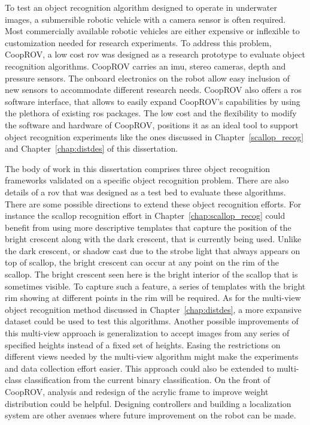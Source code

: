 \documentclass {udthesis}
\begin{document}
To test an object recognition algorithm designed to operate in underwater images, a submersible robotic vehicle with a camera sensor is often required.
Most commercially available robotic vehicles are either expensive or inflexible to customization needed for research experiments. To address this problem, CoopROV, a low cost \gls{rov} was designed as a research prototype to evaluate object recognition algorithms. CoopROV carries an \gls{imu}, stereo cameras, depth and pressure sensors. The onboard electronics on the robot allow easy inclusion of new sensors to accommodate different research needs. CoopROV also offers a \gls{ros} software interface, that allows to easily expand CoopROV's capabilities by using the plethora of existing \gls{ros} packages. The low cost and the flexibility to modify the software and hardware of CoopROV, positions it as an ideal tool to support object recognition experiments like the ones discussed in Chapter~\ref{scallop_recog} and Chapter~\ref{chap:distdes} of this dissertation.

The body of work in this dissertation comprises three object recognition frameworks validated on a specific object recognition problem. There are also details of a \gls{rov} that was designed as a test bed to evaluate these algorithms. There are some possible directions to extend these object recognition efforts. For instance the scallop recognition effort in Chapter~\ref{chap:scallop_recog} could benefit from using more descriptive 
templates that capture the position of the bright crescent along with the dark
crescent, that is currently being used. Unlike the dark crescent, or shadow cast due to the strobe light that always appears on top of scallop, the bright crescent can occur at any point on the rim of the scallop. The bright crescent seen here is the bright interior of the scallop that is sometimes visible. To capture such a feature, a series of templates with the bright rim showing at different points in the rim will be required. As for the multi-view object recognition method discussed in Chapter~\ref{chap:distdes}, a more expansive dataset could be used to test this algorithms. Another possible improvements of this multi-view approach is generalization to accept images from any series of specified heights instead of a fixed set of heights. Easing the restrictions on different views needed by the multi-view algorithm might make the experiments and data collection effort easier. This approach could also be extended to multi-class classification from the current binary classification. On the front of CoopROV, analysis and redesign of the acrylic frame to improve 
weight distribution could be helpful. Designing controllers and building a localization system are other avenues where future improvement on the robot can be made.
\end{document}
